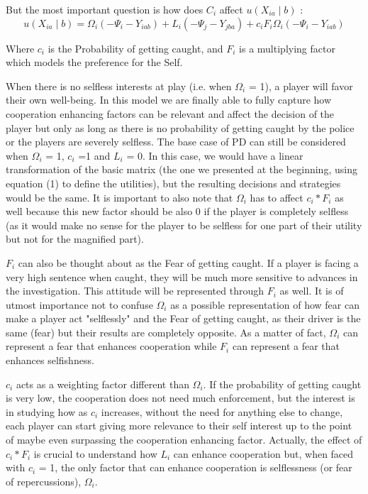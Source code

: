 \documentclass[11pt, a4paper]{article}
\begin{document}
But the most important question is how does $C_i$ affect $u\left(X_{i a} \mid b\right)$ :
\begin{equation}
   u\left(X_{i a} \mid b\right)=\Omega_i\left(-\Psi_i-Y_{i a b}\right)+L_i\left(-\Psi_j-Y_{j b a}\right)+c_i F_i \Omega_i\left(-\Psi_i-Y_{i a b}\right) 
\end{equation}

Where $c_i$ is the Probability of getting caught, and $F_i$ is a multiplying factor which models the preference for the Self. 

When there is no selfless interests at play (i.e. when $\Omega_i$ = 1), a player will favor their own well-being.
In this model we are finally able to fully capture how cooperation enhancing factors can be relevant and affect the decision of the player but only as long as there is no probability
of getting caught by the police or the players are severely selfless. The base case of PD can still be considered when $\Omega_i$ = 1, $c_i$ =1 and $L_i$ = 0. In this case, we would have a linear transformation of the basic matrix (the one we presented at the beginning, using equation (1) to define the utilities), but the resulting decisions and strategies would be the
same. It is important to also note that $\Omega_i$ has to affect $c_i*F_i$ as well because this new factor should be also 0 if the player is completely selfless (as it would make no sense for the player to be selfless for one part of their utility but not for the magnified part).

$F_i$ can also be thought about as the Fear of getting caught. If a player is facing a very high sentence when caught, they will be much more sensitive to advances in the
investigation. This attitude will be represented through $F_i$ as well.
It is of utmost importance not to confuse $\Omega_i$ as a possible representation of how fear can make a player act "selflessly" and the Fear of getting caught, as their driver is the same (fear) but their results are completely opposite. As a matter of fact, $\Omega_i$ can represent a fear that enhances cooperation while $F_i$ can represent a fear that enhances
selfishness. 

$c_i$ acts as a weighting factor different than $\Omega_i$. If the probability of getting caught is very low, the cooperation does not need much enforcement, but the interest is in studying
how as $c_i$ increases, without the need for anything else to change, each player can start giving more relevance to their self interest up to the point of maybe even surpassing the
cooperation enhancing factor. Actually, the effect of $c_i*F_i$ is crucial to understand how $L_i$ can enhance cooperation but, when faced with $c_i$ = 1, the only factor that can enhance cooperation is selflessness (or fear of repercussions), $\Omega_i$.
\end{document}
